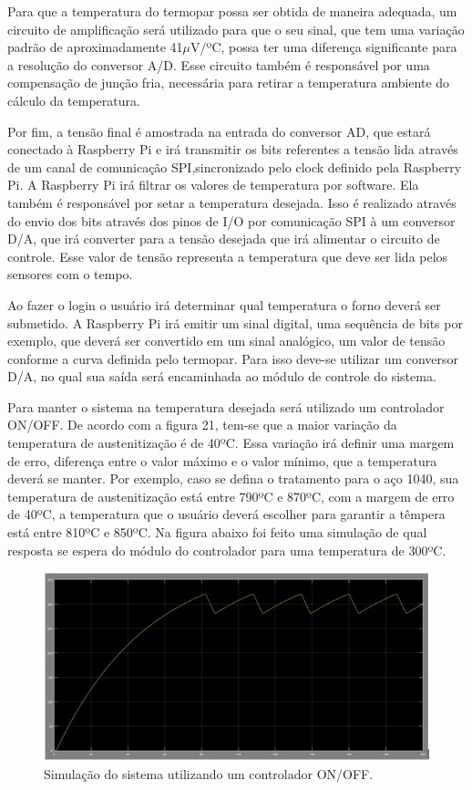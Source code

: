 Para que a temperatura do termopar possa ser obtida de maneira adequada, um circuito de amplificação será utilizado para que o seu sinal, que tem uma variação padrão de aproximadamente 41$\mu$V/ºC, possa ter uma diferença significante para a resolução do conversor A/D. Esse circuito também é responsável por uma compensação de junção fria, necessária para retirar a temperatura ambiente do cálculo da temperatura.

Por fim, a tensão final é amostrada na entrada do conversor AD, que estará conectado à Raspberry Pi e irá transmitir os bits referentes a tensão lida através de um canal de comunicação SPI,sincronizado pelo clock definido pela Raspberry Pi. A Raspberry Pi irá filtrar os valores de temperatura por software. Ela também é responsável por setar a temperatura desejada. Isso é realizado através do envio dos bits através dos pinos de I/O por comunicação SPI à um conversor D/A, que irá converter para a tensão desejada que irá alimentar o circuito de controle. Esse valor de tensão representa a temperatura que deve ser lida pelos sensores com o tempo.

Ao fazer o login o usuário irá determinar qual temperatura o forno deverá ser submetido. A Raspberry Pi irá emitir um sinal digital, uma sequência de bits por exemplo, que deverá ser convertido em um sinal analógico, um valor de tensão conforme a curva definida pelo termopar. Para isso deve-se utilizar um conversor D/A, no qual sua saída será encaminhada ao módulo de controle do sistema.

Para manter o sistema na temperatura desejada será utilizado um controlador ON/OFF. De acordo com a figura 21, tem-se que a maior variação da temperatura de austenitização é de 40ºC. Essa variação irá definir uma margem de erro, diferença entre o valor máximo e o valor mínimo, que a temperatura deverá se manter. Por exemplo, caso se defina o tratamento para o aço 1040, sua temperatura de austenitização está entre 790ºC e 870ºC, com a margem de erro de 40ºC, a temperatura que o usuário deverá escolher para garantir a têmpera está entre 810ºC e 850ºC. Na figura abaixo foi feito uma simulação de qual resposta se espera do módulo do controlador para uma temperatura de 300ºC.

\begin{figure}[h]
	\centering
	\label{on_off}
	\includegraphics[keepaspectratio=true,scale=0.8]{figuras/on_off.JPG}
	\caption{Simulação do sistema utilizando um controlador ON/OFF.}
\end{figure}


